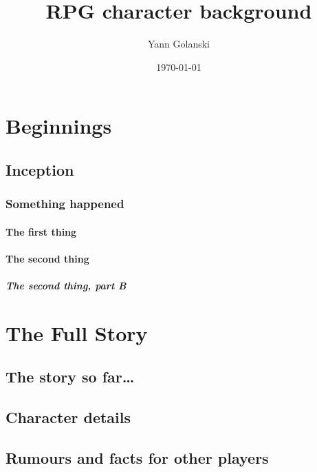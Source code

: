 \documentclass[a4paper,twoside,twocolumn,10pt,bringhurst]{memoir}
\title{RPG character background}
\date{\today}
\author{Yann Golanski}
\begin{document}
\frontmatter
\maketitle
\tableofcontents

\mainmatter

\part{Beginnings}

\chapter{Inception}



\lipsum[1]

\lipsum[2]

\section{Something happened}

\subsection{The first thing}

\lipsum[3]

\lipsum[4]

\subsection{The second thing}

\lipsum[5]

\subsubsection{The second thing, part B}

\lipsum[6]

\part{The Full Story}

\chapter{The story so far\ldots}



\chapter{Character details}

\lipsum[7]

\chapter{Rumours and facts for other players}

\lipsum[8]

\end{document}
